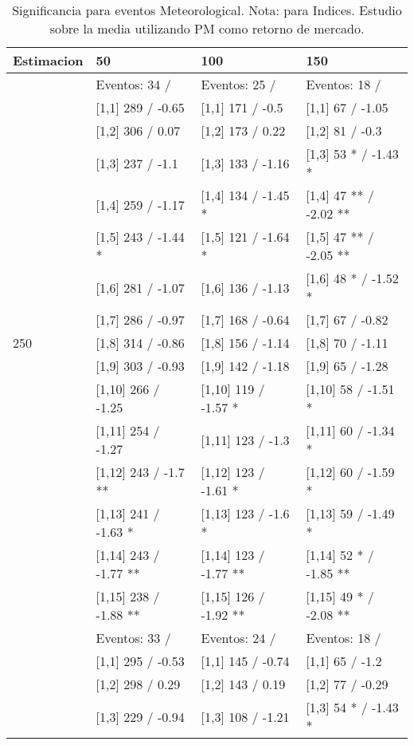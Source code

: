 \begin{table}

\caption{Significancia para eventos Meteorological. Nota: para Indices. Estudio sobre la media utilizando PM como retorno de mercado.}
\centering
\begin{tabular}[t]{llll}
\toprule
Estimacion & 50 & 100 & 150\\
\midrule
 & Eventos:  34 / & Eventos:  25 / & Eventos:  18 /\\
 & {}[1,1] 289  / -0.65 & {}[1,1] 171  / -0.5 & {}[1,1] 67  / -1.05\\
 & {}[1,2] 306  / 0.07 & {}[1,2] 173  / 0.22 & {}[1,2] 81  / -0.3\\
 & {}[1,3] 237  / -1.1 & {}[1,3] 133  / -1.16 & {}[1,3] 53 * / -1.43 *\\
 & {}[1,4] 259  / -1.17 & {}[1,4] 134  / -1.45 * & {}[1,4] 47 ** / -2.02 **\\
\addlinespace
 & {}[1,5] 243  / -1.44 * & {}[1,5] 121  / -1.64 * & {}[1,5] 47 ** / -2.05 **\\
 & {}[1,6] 281  / -1.07 & {}[1,6] 136  / -1.13 & {}[1,6] 48 * / -1.52 *\\
 & {}[1,7] 286  / -0.97 & {}[1,7] 168  / -0.64 & {}[1,7] 67  / -0.82\\
250 & {}[1,8] 314  / -0.86 & {}[1,8] 156  / -1.14 & {}[1,8] 70  / -1.11\\
 & {}[1,9] 303  / -0.93 & {}[1,9] 142  / -1.18 & {}[1,9] 65  / -1.28\\
\addlinespace
 & {}[1,10] 266  / -1.25 & {}[1,10] 119  / -1.57 * & {}[1,10] 58  / -1.51 *\\
 & {}[1,11] 254  / -1.27 & {}[1,11] 123  / -1.3 & {}[1,11] 60  / -1.34 *\\
 & {}[1,12] 243  / -1.7 ** & {}[1,12] 123  / -1.61 * & {}[1,12] 60  / -1.59 *\\
 & {}[1,13] 241  / -1.63 * & {}[1,13] 123  / -1.6 * & {}[1,13] 59  / -1.49 *\\
 & {}[1,14] 243  / -1.77 ** & {}[1,14] 123  / -1.77 ** & {}[1,14] 52 * / -1.85 **\\
\addlinespace
 & {}[1,15] 238  / -1.88 ** & {}[1,15] 126  / -1.92 ** & {}[1,15] 49 * / -2.08 **\\
 & Eventos:  33 / & Eventos:  24 / & Eventos:  18 /\\
 & {}[1,1] 295  / -0.53 & {}[1,1] 145  / -0.74 & {}[1,1] 65  / -1.2\\
 & {}[1,2] 298  / 0.29 & {}[1,2] 143  / 0.19 & {}[1,2] 77  / -0.29\\
 & {}[1,3] 229  / -0.94 & {}[1,3] 108  / -1.21 & {}[1,3] 54 * / -1.43 *\\

\end{tabular}
\end{table}
